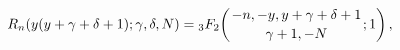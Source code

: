 \[\mathop{R_{n}\/}\nolimits\!\left(y(y+\gamma+\delta+1);\gamma,\delta,N\right)=%
\mathop{{{}_{3}F_{2}}\/}\nolimits\!\left({-n,-y,y+\gamma+\delta+1\atop\gamma+1%
,-N};1\right),\]